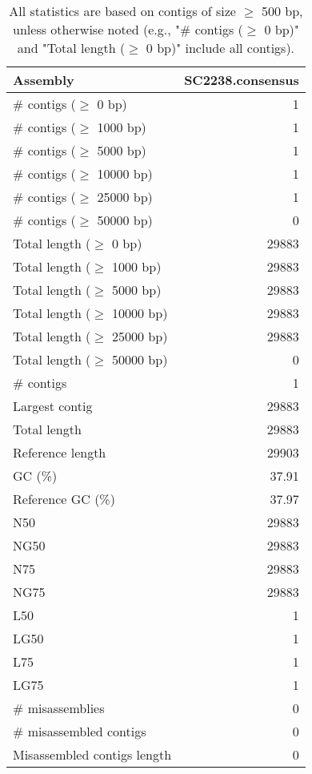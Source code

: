 \documentclass[12pt,a4paper]{article}
\begin{document}
\begin{table}[ht]
\begin{center}
\caption{All statistics are based on contigs of size $\geq$ 500 bp, unless otherwise noted (e.g., "\# contigs ($\geq$ 0 bp)" and "Total length ($\geq$ 0 bp)" include all contigs).}
\begin{tabular}{|l*{1}{|r}|}
\hline
Assembly & SC2238.consensus \\ \hline
\# contigs ($\geq$ 0 bp) & 1 \\ \hline
\# contigs ($\geq$ 1000 bp) & 1 \\ \hline
\# contigs ($\geq$ 5000 bp) & 1 \\ \hline
\# contigs ($\geq$ 10000 bp) & 1 \\ \hline
\# contigs ($\geq$ 25000 bp) & 1 \\ \hline
\# contigs ($\geq$ 50000 bp) & 0 \\ \hline
Total length ($\geq$ 0 bp) & 29883 \\ \hline
Total length ($\geq$ 1000 bp) & 29883 \\ \hline
Total length ($\geq$ 5000 bp) & 29883 \\ \hline
Total length ($\geq$ 10000 bp) & 29883 \\ \hline
Total length ($\geq$ 25000 bp) & 29883 \\ \hline
Total length ($\geq$ 50000 bp) & 0 \\ \hline
\# contigs & 1 \\ \hline
Largest contig & 29883 \\ \hline
Total length & 29883 \\ \hline
Reference length & 29903 \\ \hline
GC (\%) & 37.91 \\ \hline
Reference GC (\%) & 37.97 \\ \hline
N50 & 29883 \\ \hline
NG50 & 29883 \\ \hline
N75 & 29883 \\ \hline
NG75 & 29883 \\ \hline
L50 & 1 \\ \hline
LG50 & 1 \\ \hline
L75 & 1 \\ \hline
LG75 & 1 \\ \hline
\# misassemblies & 0 \\ \hline
\# misassembled contigs & 0 \\ \hline
Misassembled contigs length & 0 \\ \hline

\end{tabular}
\end{center}
\end{table}
\end{document}
